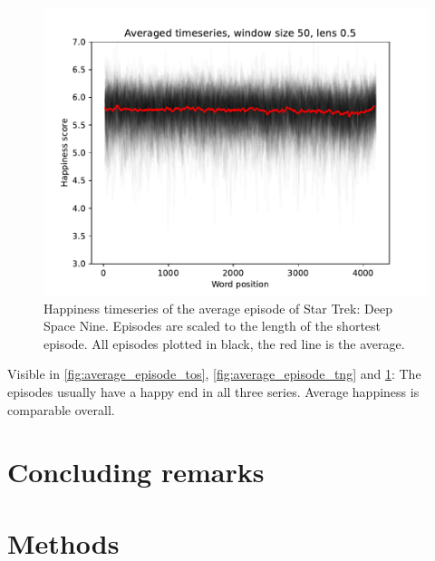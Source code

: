 \begin{figure}
    \centering
    \includegraphics[width=\columnwidth]{figures/localized/average_episode_ds9.pdf}
    \caption{Happiness timeseries of the average episode of Star Trek: Deep Space Nine. Episodes are scaled to the length of the shortest episode. All episodes plotted in black, the red line is the average.}
    \label{fig:average_episode_ds9}
\end{figure}

Visible in \ref{fig:average_episode_tos}, \ref{fig:average_episode_tng} and \ref{fig:average_episode_ds9}: The episodes usually have a happy end in all three series. Average happiness is comparable overall.

\section{Concluding remarks}
\label{sec:papertag.concludingremarks}


\section{Methods}
\label{sec:papertag.methods}

